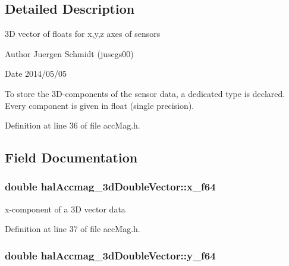 \subsection{Detailed Description}
3\+D vector of floats for x,y,z axes of sensors 



 \begin{DoxyAuthor}{Author}
Juergen Schmidt (juscgs00) 
\end{DoxyAuthor}
\begin{DoxyDate}{Date}
2014/05/05
\end{DoxyDate}
To store the 3\+D-\/components of the sensor data, a dedicated type is declared. Every component is given in float (single precision).

Definition at line 36 of file acc\+Mag.\+h.



\subsection{Field Documentation}
\hypertarget{structhalAccmag__3dDoubleVector_a011646ea6f4b78400dfd2ffa8eb45eea_a011646ea6f4b78400dfd2ffa8eb45eea}{
\subsubsection[{x\+\_\+f64}]{\setlength{\rightskip}{0pt plus 5cm}double hal\+Accmag\+\_\+3d\+Double\+Vector\+::x\+\_\+f64}}\label{structhalAccmag__3dDoubleVector_a011646ea6f4b78400dfd2ffa8eb45eea_a011646ea6f4b78400dfd2ffa8eb45eea}


x-\/component of a 3\+D vector data 



Definition at line 37 of file acc\+Mag.\+h.

\hypertarget{structhalAccmag__3dDoubleVector_a88f4ed3363ccaa08c00d2fc28f7b2ab4_a88f4ed3363ccaa08c00d2fc28f7b2ab4}{
\subsubsection[{y\+\_\+f64}]{\setlength{\rightskip}{0pt plus 5cm}double hal\+Accmag\+\_\+3d\+Double\+Vector\+::y\+\_\+f64}}\label{structhalAccmag__3dDoubleVector_a88f4ed3363ccaa08c00d2fc28f7b2ab4_a88f4ed3363ccaa08c00d2fc28f7b2ab4}


